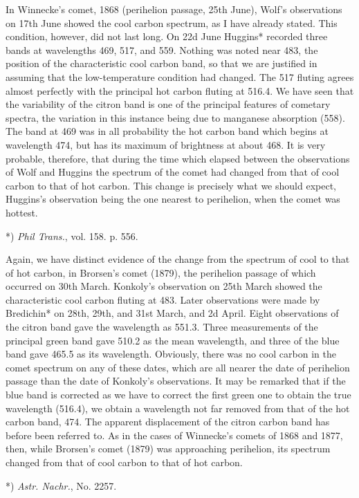 \documentclass[a4paper, 12pt, oneside, polutonikogreek, english]{article}
\begin{document}
In Winnecke's comet, 1868 (perihelion passage, 25th June), Wolf's observations on 17th June showed the cool carbon spectrum, as I have already stated. This condition, however, did not last long. On 22d June Huggins* recorded three bands at wavelengths 469, 517, and 559. Nothing was noted near 483, the position of the characteristic cool carbon band, so that we are justified in assuming that the low-temperature condition had changed. The 517 fluting agrees almost perfectly with the principal hot carbon fluting at 516.4. We have seen that the variability of the citron band is one of the principal features of cometary spectra, the variation in this instance being due to manganese absorption (558). The band at 469 was in all probability the hot carbon band which begins at wavelength 474, but has its maximum of brightness at about 468. It is very probable, therefore, that during the time which elapsed between the observations of Wolf and Huggins the spectrum of the comet had changed from that of cool carbon to that of hot carbon. This change is precisely what we should expect, Huggins's observation being the one nearest to perihelion, when the comet was hottest.

*) \emph{Phil Trans.}, vol. 158. p. 556.

Again, we have distinct evidence of the change from the spectrum of cool to that of hot carbon, in Brorsen's comet (1879), the perihelion passage of which occurred on 30th March. Konkoly's observation on 25th March showed the characteristic cool carbon fluting at 483. Later observations were made by Bredichin* on 28th, 29th, and 31st March, and 2d April. Eight observations of the citron band gave the wavelength as 551.3. Three measurements of the principal green band gave 510.2 as the mean wavelength, and three of the blue band gave 465.5 as its wavelength. Obviously, there was no cool carbon in the comet spectrum on any of these dates, which are all nearer the date of perihelion passage than the date of Konkoly's observations. It may be remarked that if the blue band is corrected as we have to correct the first green one to obtain the true wavelength (516.4), we obtain a wavelength not far removed from that of the hot carbon band, 474. The apparent displacement of the citron carbon band has before been referred to. As in the cases of Winnecke's comets of 1868 and 1877, then, while Brorsen's comet (1879) was approaching perihelion, its spectrum changed from that of cool carbon to that of hot carbon.

*) \emph{Astr. Nachr.}, No. 2257.
\end{document}
